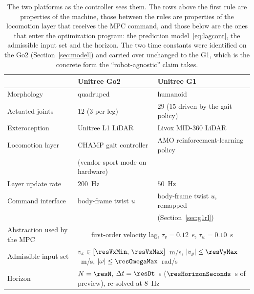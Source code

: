 \documentclass[11pt,a4paper]{article}
\begin{document}
\begin{table}[htbp]
  \centering
  \small
  \caption{The two platforms as the controller sees them. The rows above the first rule are properties of the
  machine, those between the rules are properties of the locomotion layer that receives the MPC command, and
  those below are the ones that enter the optimization program: the prediction model~\eqref{eq:lagcont}, the
  admissible input set and the horizon. The two
  time constants were identified on the Go2 (Section~\ref{sec:model}) and carried over unchanged to the G1,
  which is the concrete form the ``robot-agnostic'' claim takes.}
  \label{tab:platforms}
  \begin{tabular}{lll}
    \toprule
                                  & Unitree Go2                     & Unitree G1 \\
    \midrule
    Morphology                    & quadruped                       & humanoid \\
    Actuated joints               & $12$ ($3$ per leg)              & $29$ ($15$ driven by the gait policy) \\
    Exteroception                 & Unitree L1 LiDAR                & Livox MID-360 LiDAR \\
    \midrule
    Locomotion layer              & CHAMP gait controller           & AMO reinforcement-learning policy \\
                                  & (vendor sport mode on hardware) & \\
    Layer update rate             & $200$~Hz                        & $50$~Hz \\
    Command interface             & body-frame twist $u$            & body-frame twist $u$, remapped \\
                                  &                                 & (Section~\ref{sec:g1rl}) \\
    \midrule
    Abstraction used by the MPC   & \multicolumn{2}{c}{first-order velocity lag, $\tau_v=0.12$~s, $\tau_w=0.10$~s} \\
    Admissible input set          & \multicolumn{2}{l}{$v_x\in[\resVxMin,\,\resVxMax]$~m/s, $|v_y|\le\resVyMax$~m/s, $|\omega|\le\resOmegaMax$~rad/s} \\
    Horizon                       & \multicolumn{2}{l}{$N=\resN$, $\Delta t=\resDt$~s ($\resHorizonSeconds$~s of preview), re-solved at $8$~Hz} \\
    \bottomrule
  \end{tabular}
\end{table}
\end{document}
